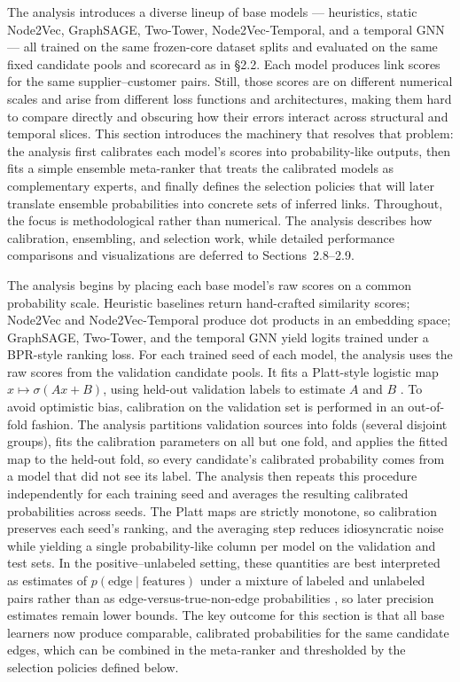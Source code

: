 The analysis introduces a diverse lineup of base models --- heuristics, static Node2Vec, GraphSAGE, Two-Tower, Node2Vec-Temporal, and a temporal GNN --- all trained on the same frozen-core dataset splits and evaluated on the same fixed candidate pools and scorecard as in \S2.2. Each model produces link scores for the same supplier--customer pairs. Still, those scores are on different numerical scales and arise from different loss functions and architectures, making them hard to compare directly and obscuring how their errors interact across structural and temporal slices. This section introduces the machinery that resolves that problem: the analysis first calibrates each model's scores into probability-like outputs, then fits a simple ensemble meta-ranker that treats the calibrated models as complementary experts, and finally defines the selection policies that will later translate ensemble probabilities into concrete sets of inferred links. Throughout, the focus is methodological rather than numerical. The analysis describes how calibration, ensembling, and selection work, while detailed performance comparisons and visualizations are deferred to Sections~2.8--2.9.

The analysis begins by placing each base model's raw scores on a common probability scale. Heuristic baselines return hand-crafted similarity scores; Node2Vec and Node2Vec-Temporal produce dot products in an embedding space; GraphSAGE, Two-Tower, and the temporal GNN yield logits trained under a BPR-style ranking loss. For each trained seed of each model, the analysis uses the raw scores from the validation candidate pools. It fits a Platt-style logistic map \(x \mapsto \sigma(Ax + B)\), using held-out validation labels to estimate \(A\) and \(B\) \parencite{platt_probabilistic_1999,niculescu-mizil_predicting_2005}. To avoid optimistic bias, calibration on the validation set is performed in an out-of-fold fashion. The analysis partitions validation sources into folds (several disjoint groups), fits the calibration parameters on all but one fold, and applies the fitted map to the held-out fold, so every candidate's calibrated probability comes from a model that did not see its label. The analysis then repeats this procedure independently for each training seed and averages the resulting calibrated probabilities across seeds. The Platt maps are strictly monotone, so calibration preserves each seed's ranking, and the averaging step reduces idiosyncratic noise while yielding a single probability-like column per model on the validation and test sets. In the positive--unlabeled setting, these quantities are best interpreted as estimates of \(p(\text{edge} \mid \text{features})\) under a mixture of labeled and unlabeled pairs rather than as edge-versus-true-non-edge probabilities \parencite{elkan_learning_2008}, so later precision estimates remain lower bounds. The key outcome for this section is that all base learners now produce comparable, calibrated probabilities for the same candidate edges, which can be combined in the meta-ranker and thresholded by the selection policies defined below.

